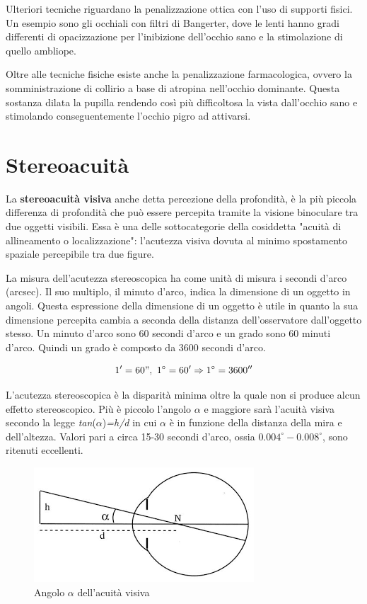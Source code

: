 \documentclass[
	corpo=12pt,
	twoside,
 	evenboxes,
	tipotesi=triennale,
    	stile=classica,
   	 greek,
]{toptesi}
\begin{document}
Ulteriori tecniche riguardano la penalizzazione ottica con l'uso di supporti fisici. Un esempio sono gli occhiali con filtri di Bangerter, dove le lenti hanno gradi differenti di opacizzazione per l’inibizione dell’occhio sano e la stimolazione di quello ambliope.

Oltre alle tecniche fisiche esiste anche la penalizzazione farmacologica, ovvero la somministrazione di collirio a base di atropina
nell’occhio dominante. Questa sostanza dilata la pupilla rendendo così più difficoltosa la vista dall’occhio sano e stimolando conseguentemente l’occhio pigro ad attivarsi.

\newpage

\section{Stereoacuità}
\label{sec:stereoacuità}
La \textbf{stereoacuità visiva} anche detta percezione della profondità, è la più piccola differenza di profondità che può essere percepita tramite la visione binoculare tra due oggetti visibili.
Essa è una delle sottocategorie della cosiddetta "acuità di allineamento o localizzazione": l'acutezza visiva dovuta al minimo spostamento spaziale percepibile tra due figure.

La misura dell'acutezza stereoscopica ha come unità di misura i secondi d'arco (arcsec). Il suo multiplo, il minuto d'arco, indica la dimensione di un oggetto in angoli. Questa espressione della dimensione di un oggetto è utile in quanto la sua dimensione percepita cambia a seconda della distanza dell'osservatore dall'oggetto stesso. Un minuto d'arco sono 60 secondi d'arco e un grado sono 60 minuti d'arco. Quindi un grado è composto da 3600 secondi d'arco.

\[ 1'=60",\ 1^\circ =60' \Rightarrow 1^\circ=3600'' \]

\vfill

L'acutezza stereoscopica è la disparità minima oltre la quale non si produce alcun effetto stereoscopico. Più è piccolo l'angolo $\alpha$ e maggiore sarà l'acuità visiva secondo la legge \textit{tan}($\alpha$)\textit{=h/d} in cui $\alpha$ è in funzione della distanza della mira e dell'altezza. Valori pari a circa 15-30 secondi d’arco, ossia $0.004^\circ-0.008^\circ$, sono ritenuti eccellenti.

\begin{figure}[H]
\centering
\includegraphics[width=0.55\columnwidth]{images/misurazione_stereoacuita.png}
\caption{Angolo $\alpha$ dell'acuità visiva}
\label{fig:misurazione_stereoacuita}
\end{figure}
\end{document}
